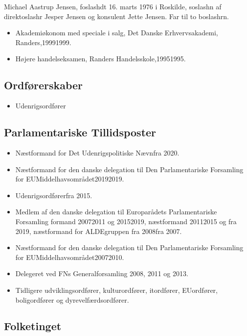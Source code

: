 \documentclass[11pt, a4paper]{awesome-cv}
\begin{document}
\makecvheader[R]
\makelettertitle
\begin{cvletter}
Michael Aastrup Jensen, foslashdt 16. marts 1976 i Roskilde, soslashn af direktoslashr Jesper Jensen og konsulent Jette Jensen. Far til to boslashrn.

\begin{itemize}
\item Akademiøkonom med speciale i salg, Det Danske Erhvervsakademi, Randers,19991999.
\item Højere handelseksamen, Randers Handelsskole,19951995.
\end{itemize}
\subsection*{Ordførerskaber}
\begin{itemize}
\item Udenrigsordfører
\end{itemize}
\subsection*{Parlamentariske Tillidsposter}
\begin{itemize}
\item Næstformand for Det Udenrigspolitiske Nævnfra 2020.
\item Næstformand for den danske delegation til Den Parlamentariske Forsamling for EUMiddelhavsområdet20192019.
\item Udenrigsordførerfra 2015.
\item Medlem af den danske delegation til Europarådets Parlamentariske Forsamling formand 20072011 og 20152019, næstformand 20112015 og fra 2019, næstformand for ALDEgruppen fra 2008fra 2007.
\item Næstformand for den danske delegation til Den Parlamentariske Forsamling for EUMiddelhavsområdet20072010.
\item Delegeret ved FNs Generalforsamling 2008, 2011 og 2013.
\item Tidligere udviklingsordfører, kulturordfører, itordfører, EUordfører, boligordfører og dyrevelfærdsordfører.
\end{itemize}
\subsection*{Folketinget}

\end{cvletter}
\end{document}
